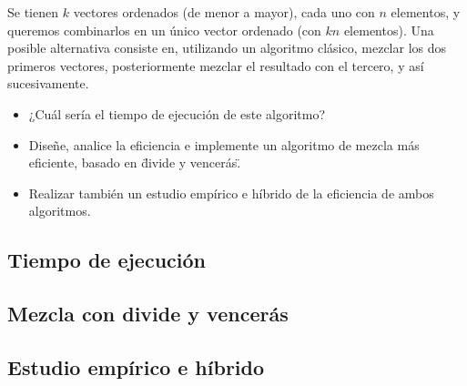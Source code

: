 
Se tienen $k$ vectores ordenados (de menor a mayor), cada uno con $n$ elementos, y queremos
combinarlos en un \'unico vector ordenado (con $kn$ elementos). Una posible alternativa consiste en, utilizando un algoritmo cl\'asico, mezclar los dos primeros vectores, posteriormente mezclar el resultado con el tercero, y as\'i sucesivamente.

\begin{itemize}
    \item ¿Cu\'al ser\'ia el tiempo de ejecuci\'on de este algoritmo?
	\item Diseñe, analice la eficiencia e implemente un algoritmo de mezcla m\'as eficiente, 		  basado en \"divide y vencer\'as\".
	\item Realizar tambi\'en un estudio emp\'irico e h\'ibrido de la eficiencia de ambos 				  algoritmos.
\end{itemize}

\subsection{Tiempo de ejecuci\'on}
\subsection{Mezcla con divide y vencer\'as}
\subsection{Estudio emp\'irico e h\'ibrido}
